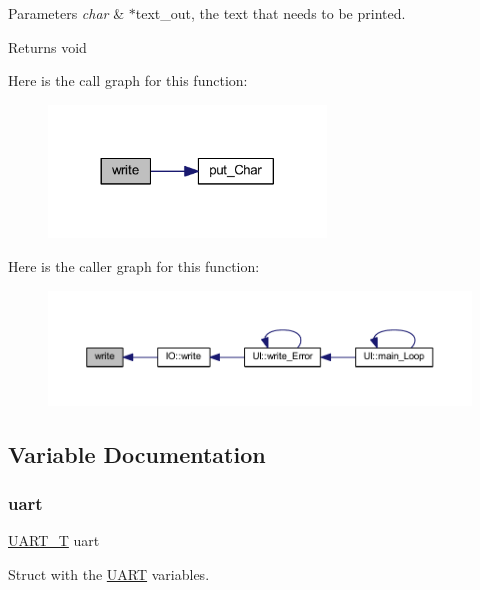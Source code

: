 \begin{DoxyParams}{Parameters}
{\em char} & $\ast$text\+\_\+out, the text that needs to be printed. \\
\hline
\end{DoxyParams}
\begin{DoxyReturn}{Returns}
void 
\end{DoxyReturn}
Here is the call graph for this function\+:\nopagebreak
\begin{figure}[H]
\begin{center}
\leavevmode
\includegraphics[width=209pt]{namespace_u_a_r_t_a20b32a5769a95ed363726431c01702e9_cgraph}
\end{center}
\end{figure}
Here is the caller graph for this function\+:\nopagebreak
\begin{figure}[H]
\begin{center}
\leavevmode
\includegraphics[width=350pt]{namespace_u_a_r_t_a20b32a5769a95ed363726431c01702e9_icgraph}
\end{center}
\end{figure}


\subsection{Variable Documentation}
\mbox{\label{namespace_u_a_r_t_ad3d568c339fc1df943e142e2e931299c}} 
\subsubsection{\texorpdfstring{uart}{uart}}
{\footnotesize\ttfamily \mbox{\hyperlink{struct_u_a_r_t_1_1_u_a_r_t___t}{U\+A\+R\+T\+\_\+T}} uart}



Struct with the \mbox{\hyperlink{namespace_u_a_r_t}{U\+A\+RT}} variables. 


